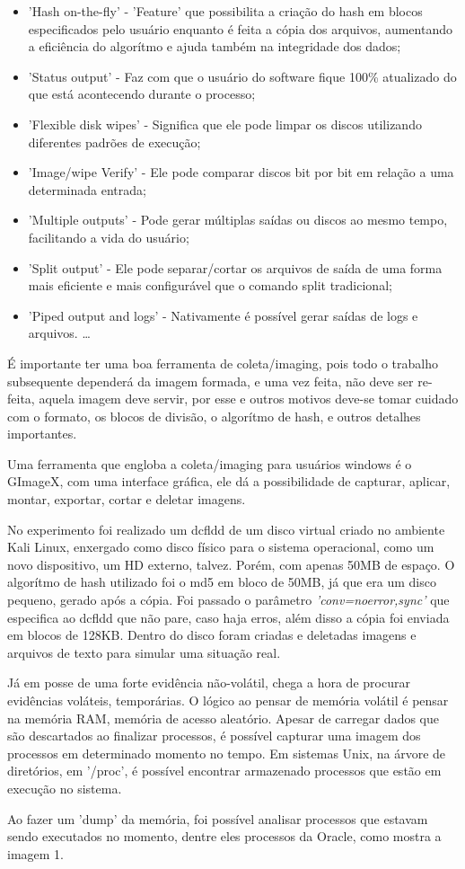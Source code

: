 \documentclass[journal]{IEEEtran}
\begin{document}
\begin{itemize}  
\item 'Hash on-the-fly' - 'Feature' que possibilita a criação do hash em blocos especificados pelo usuário enquanto é feita a cópia dos arquivos, aumentando a eficiência do algorítmo e ajuda também na integridade dos dados;
\item 'Status output' - Faz com que o usuário do software fique 100\% atualizado do que está acontecendo durante o processo;
\item 'Flexible disk wipes' - Significa que ele pode limpar os discos utilizando diferentes padrões de execução;
\item 'Image/wipe Verify' - Ele pode comparar discos bit por bit em relação a uma determinada entrada;
\item 'Multiple outputs' - Pode gerar múltiplas saídas ou discos ao mesmo tempo, facilitando a vida do usuário;
\item 'Split output' - Ele pode separar/cortar os arquivos de saída de uma forma mais eficiente e mais configurável que o comando split tradicional;
\item 'Piped output and logs' - Nativamente é possível gerar saídas de logs e arquivos.
\ldots 
\end{itemize}

É importante ter uma boa ferramenta de coleta/imaging, pois todo o trabalho subsequente dependerá da imagem formada, e uma vez feita, não deve ser re-feita, aquela imagem deve servir, por esse e outros motivos deve-se tomar cuidado com o formato, os blocos de divisão, o algorítmo de hash, e outros detalhes importantes.\par
Uma ferramenta que engloba a coleta/imaging para usuários windows é o GImageX, com uma interface gráfica, ele dá a possibilidade de capturar, aplicar, montar, exportar, cortar e deletar imagens.\par
No experimento foi realizado um dcfldd de um disco virtual criado no ambiente Kali Linux, enxergado como disco físico para o sistema operacional, como um novo dispositivo, um HD externo, talvez. Porém, com apenas 50MB de espaço. O algorítmo de hash utilizado foi o md5 em bloco de 50MB, já que era um disco pequeno, gerado após a cópia. Foi passado o parâmetro \textit{'conv=noerror,sync'} que especifica ao dcfldd que não pare, caso haja erros, além disso a cópia foi enviada em blocos de 128KB. Dentro do disco foram criadas e deletadas imagens e arquivos de texto para simular uma situação real.\par
Já em posse de uma forte evidência não-volátil, chega a hora de procurar evidências voláteis, temporárias. O lógico ao pensar de memória volátil é pensar na memória RAM, memória de acesso aleatório. Apesar de carregar dados que são descartados ao finalizar processos, é possível capturar uma imagem dos processos em determinado momento no tempo. Em sistemas Unix, na árvore de diretórios, em '/proc', é possível encontrar armazenado processos que estão em execução no sistema. \par
Ao fazer um 'dump' da memória, foi possível analisar processos que estavam sendo executados no momento, dentre eles processos da Oracle, como mostra a imagem 1.
\end{document}
